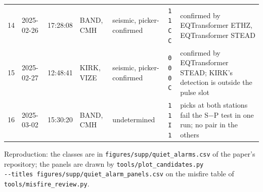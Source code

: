 \documentclass[11pt,a4paper]{article}
\newcommand{\tool}[1]{\nolinkurl{#1}}
\begin{document}
\begin{table}[htbp]
\begin{tabular}{@{}rllllcp{4.6cm}@{}}
    14 & 2025-02-26 & 17:28:08 & BAND, CMH & seismic, picker-confirmed & \texttt{1 1 C C} & confirmed by EQTransformer ETHZ, EQTransformer STEAD \\
    15 & 2025-02-27 & 12:48:41 & KIRK, VIZE & seismic, picker-confirmed & \texttt{0 0 0 C} & confirmed by EQTransformer STEAD; KIRK's detection is outside the pulse slot \\
    16 & 2025-03-02 & 15:30:20 & BAND, CMH & undetermined & \texttt{1 1 I 1} & picks at both stations fail the S$-$P test in one run; no pair in the others \\
    \bottomrule
  \end{tabular}
\end{table}

\noindent Reproduction: the classes are in \tool{figures/supp/quiet_alarms.csv} of
the paper's repository; the panels are drawn by \tool{tools/plot_candidates.py
--titles figures/supp/quiet_alarm_panels.csv} on the misfire table of
\tool{tools/misfire_review.py}.
\end{document}

